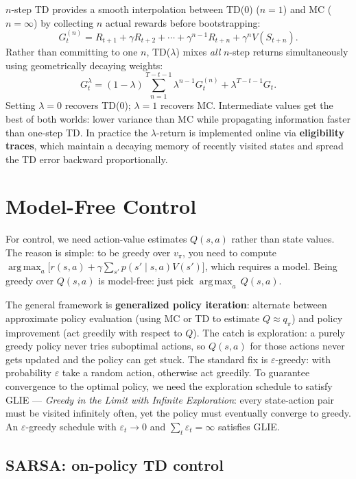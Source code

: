 \documentclass[11pt, oneside]{book}
\newcommand{\argmax}{\operatorname*{arg\,max}}
\newcommand{\vpi}{v_{\pi}}               %
\newcommand{\qpi}{q_{\pi}}               %
\begin{document}
$n$-step TD provides a smooth interpolation between TD(0) ($n=1$) and MC
($n=\infty$) by collecting $n$ actual rewards before bootstrapping:
\[
  G_t^{(n)} = R_{t+1} + \gamma R_{t+2} + \cdots + \gamma^{n-1}R_{t+n} + \gamma^n V(S_{t+n}).
\]
Rather than committing to one $n$, TD($\lambda$) mixes \emph{all} $n$-step
returns simultaneously using geometrically decaying weights:
\[
  G_t^\lambda = (1-\lambda)\sum_{n=1}^{T-t-1}\lambda^{n-1}G_t^{(n)}
  + \lambda^{T-t-1}G_t.
\]
Setting $\lambda=0$ recovers TD(0); $\lambda=1$ recovers MC.
Intermediate values get the best of both worlds: lower variance than MC while
propagating information faster than one-step TD.
In practice the $\lambda$-return is implemented online via
\textbf{eligibility traces}, which maintain a decaying memory of recently
visited states and spread the TD error backward proportionally.

\section{Model-Free Control}

For control, we need action-value estimates $Q(s,a)$ rather than state values.
The reason is simple: to be greedy over $\vpi$, you need to compute
$\argmax_a\bigl[r(s,a) + \gamma\sum_{s'} p(s'\mid s,a)V(s')\bigr]$,
which requires a model.
Being greedy over $Q(s,a)$ is model-free: just pick $\argmax_a\,Q(s,a)$.

The general framework is \textbf{generalized policy iteration}: alternate
between approximate policy evaluation (using MC or TD to estimate $Q \approx \qpi$)
and policy improvement (act greedily with respect to $Q$).
The catch is exploration: a purely greedy policy never tries suboptimal actions,
so $Q(s,a)$ for those actions never gets updated and the policy can get stuck.
The standard fix is $\varepsilon$-greedy: with probability $\varepsilon$ take a
random action, otherwise act greedily.
To guarantee convergence to the optimal policy, we need the exploration schedule
to satisfy GLIE --- \emph{Greedy in the Limit with Infinite Exploration}:
every state-action pair must be visited infinitely often, yet the policy must
eventually converge to greedy.
An $\varepsilon$-greedy schedule with $\varepsilon_t \to 0$ and
$\sum_t \varepsilon_t = \infty$ satisfies GLIE.

\subsection{SARSA: on-policy TD control}
\end{document}
